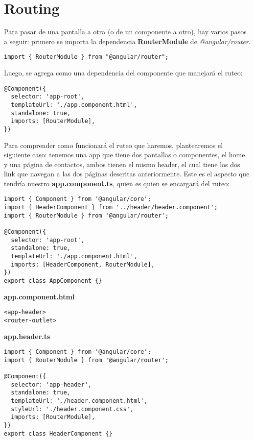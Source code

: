 \section{Routing}


Para pasar de una pantalla a otra (o de un componente a otro), hay varios pasos a seguir: primero se importa la dependencia \textbf{RouterModule} de \textit{@angular/router}.
\begin{lstlisting}[style=htmlcssjs]
import { RouterModule } from "@angular/router";
\end{lstlisting}

Luego, se agrega como una dependencia del componente que manejará el ruteo:
\begin{lstlisting}[style=htmlcssjs]
@Component({
  selector: 'app-root',
  templateUrl: './app.component.html',
  standalone: true,
  imports: [RouterModule],
})
\end{lstlisting}

Para comprender como funcionará el ruteo que haremos, plantearemos el siguiente caso: tenemos una app que tiene dos pantallas o componentes, el home y una página de contactos, ambos tienen el mismo header, el cual tiene los dos link que navegan a las dos páginas descritas anteriormente. Este es el aspecto que tendría nuestro \textbf{app.component.ts}, quien es quien se encargará del ruteo:
\begin{lstlisting}[style=htmlcssjs]
import { Component } from '@angular/core';
import { HeaderComponent } from '../header/header.component';
import { RouterModule } from '@angular/router';

@Component({
  selector: 'app-root',
  standalone: true,
  templateUrl: './app.component.html',
  imports: [HeaderComponent, RouterModule],
})
export class AppComponent {}
\end{lstlisting}

\textbf{app.component.html}
\begin{lstlisting}[style=htmlcssjs]
<app-header>
<router-outlet>
\end{lstlisting}

\textbf{app.header.ts}
\begin{lstlisting}[style=htmlcssjs]
import { Component } from '@angular/core';
import { RouterModule } from '@angular/router';

@Component({
  selector: 'app-header',
  standalone: true,
  templateUrl: './header.component.html',
  styleUrl: './header.component.css',
  imports: [RouterModule],
})
export class HeaderComponent {}
\end{lstlisting}

